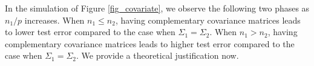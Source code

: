 
\iffalse
In the simulation of Figure \ref{fig_covariate}, we observe the following two phases as  $n_1 / p$ increases.
When $n_1 \le n_2$, having complementary covariance matrices leads to lower test error compared to the case when $\Sigma_1 = \Sigma_2$.
When $n_1 > n_2$, having complementary covariance matrices leads to higher test error compared to the case when $\Sigma_1 = \Sigma_2$.
We provide a theoretical justification now.

